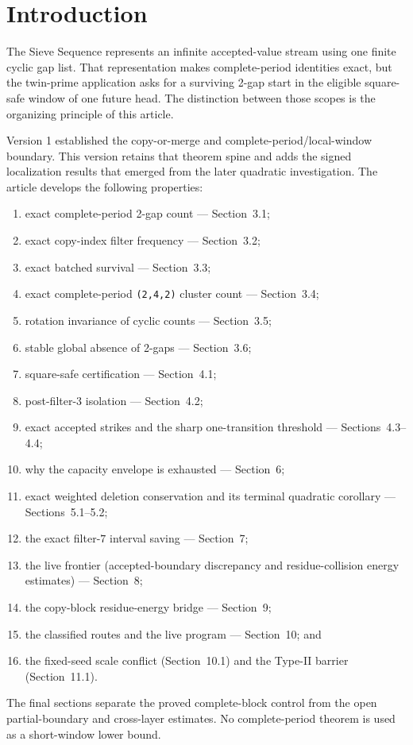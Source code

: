 \section{Introduction}
\label{sec:introduction}

The Sieve Sequence represents an infinite accepted-value stream using one
finite cyclic gap list. That representation makes complete-period
identities exact, but the twin-prime application asks for a surviving
2-gap start in the eligible square-safe window of one future head. The
distinction between those scopes is the organizing principle of this
article.

Version 1 established the copy-or-merge and complete-period/local-window
boundary. This version retains that theorem spine and adds the signed
localization results that emerged from the later quadratic investigation.
The article develops the following properties:

\begin{enumerate}
  \item exact complete-period 2-gap count --- Section~3.1;
  \item exact copy-index filter frequency --- Section~3.2;
  \item exact batched survival --- Section~3.3;
  \item exact complete-period \texttt{(2,4,2)} cluster count --- Section~3.4;
  \item rotation invariance of cyclic counts --- Section~3.5;
  \item stable global absence of 2-gaps --- Section~3.6;
  \item square-safe certification --- Section~4.1;
  \item post-filter-3 isolation --- Section~4.2;
  \item exact accepted strikes and the sharp one-transition threshold ---
    Sections~4.3--4.4;
  \item why the capacity envelope is exhausted --- Section~6;
  \item exact weighted deletion conservation and its terminal quadratic
    corollary --- Sections~5.1--5.2;
  \item the exact filter-$7$ interval saving --- Section~7;
  \item the live frontier (accepted-boundary discrepancy and
    residue-collision energy estimates) --- Section~8;
  \item the copy-block residue-energy bridge --- Section~9;
  \item the classified routes and the live program --- Section~10; and
  \item the fixed-seed scale conflict (Section~10.1) and the Type-II
    barrier (Section~11.1).
\end{enumerate}

The final sections separate the proved complete-block control from the
open partial-boundary and cross-layer estimates. No complete-period
theorem is used as a short-window lower bound.
